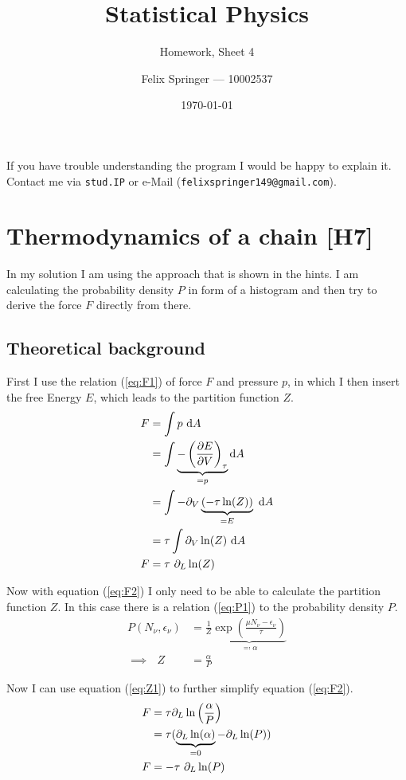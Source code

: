 \documentclass[a4paper,12pt]{scrartcl}
\title{Statistical Physics}
\subtitle{Homework, Sheet 4}
\author{Felix Springer --- 10002537}
\date{\today}
\begin{document}
\maketitle

If you have trouble understanding the program I would be happy to explain it.
Contact me via \texttt{stud.IP} or e-Mail (\texttt{felixspringer149@gmail.com}).

\section{Thermodynamics of a chain [H7]}
In my solution I am using the approach that is shown in the hints.
I am calculating the probability density $P$ in form of a histogram and then try to derive the force $F$ directly from there.

\subsection{Theoretical background}
First I use the relation (\ref{eq:F1}) of force $F$ and pressure $p$, in which I then insert the free Energy $E$, which leads to the partition function $Z$.
\begin{align}
	F &= \int p \text{ d}A \label{eq:F1} \\
	&= \int \underbrace{- \left( \frac{\partial E}{\partial V} \right)_{\tau}}_{= p} \text{d}A \notag \\
	&= \int - \partial_V \underbrace{(- \tau \ln(Z))}_{= E} \text{ d}A \notag \\
	&= \tau \int \partial_V \ln(Z) \text{ d}A \notag \\
	F &= \tau \text{ } \partial_L \ln(Z) \label{eq:F2}
\end{align}

Now with equation (\ref{eq:F2}) I only need to be able to calculate the partition function $Z$.
In this case there is a relation (\ref{eq:P1}) to the probability density $P$.
\begin{align}
	P (N_\nu, \epsilon_\nu) &= \frac{1}{Z} \underbrace{\exp \left( {\frac{\mu N_\nu - \epsilon_\nu}{\tau}} \right)}_{\eqqcolon \alpha} \label{eq:P1} \\
	\implies \text{ } Z &= \frac{\alpha}{P} \label{eq:Z1}
\end{align}

Now I can use equation (\ref{eq:Z1}) to further simplify equation (\ref{eq:F2}).
\begin{align}
	F &= \tau \partial_L \ln \left( \frac{\alpha}{P} \right) \notag \\
	&= \tau ( \underbrace{\partial_L \ln(\alpha)}_{= 0} - \partial_L \ln(P) ) \notag \\
	F &= - \tau \text{ } \partial_L \ln(P) \label{eq:F3}
\end{align}
\end{document}
